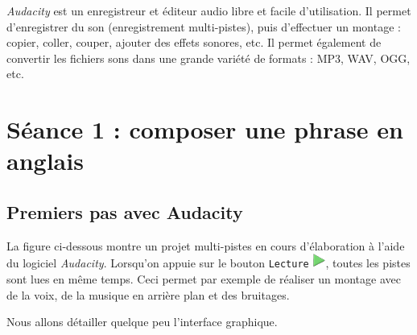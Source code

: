 \vspace{12pt}


\emph{Audacity} est un enregistreur et éditeur audio libre et facile d'utilisation. Il permet d'enregistrer du son (enregistrement multi-pistes), puis d'effectuer un montage : copier, coller, couper, ajouter des effets sonores, etc. Il permet également de convertir les fichiers sons dans une grande variété de formats : MP3, WAV, OGG, etc. 














%
%
%
%

\newpage

\section{Séance 1 : composer une phrase en anglais}\label{ficheSon5e1}


\subsection{Premiers pas avec Audacity}\label{Son1Interface}

La figure ci-dessous montre un projet multi-pistes en cours d'élaboration à l'aide du logiciel \emph{Audacity}. Lorsqu'on appuie sur le bouton \texttt{Lecture} \includegraphics[width=.4cm]{./images/son01/boutonPlay}, toutes les pistes sont lues en même temps. Ceci permet par exemple de réaliser un montage avec de la voix, de la musique en arrière plan et des bruitages.


Nous allons détailler quelque peu l'interface graphique.\\

